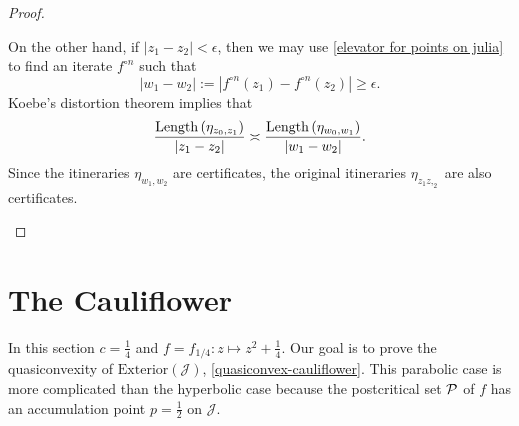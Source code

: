 \begin{proof}
\begin{enumerate}[label=\normalfont(\roman*)]
On the other hand, if $\left|z_{1}-z_{2}\right|<\epsilon$, then
we may use  \cref{elevator for points on julia} to find an iterate $f^{\circ n}$ such that 
\begin{equation}
	|w_1-w_2|:=\left|f^{\circ n}(z_{1})-f^{\circ n}(z_{2})\right|\geq\epsilon.
\end{equation}
Koebe's distortion theorem implies that 
\begin{equation}
	\frac{\operatorname{Length}\left(\eta_{z_{0},z_{1}}\right)}{|z_1-z_2|}\asymp\frac{\operatorname{Length}\left(\eta_{w_0,w_1}\right)}{|w_1-w_2|}.
\end{equation}
Since the itineraries $\eta_{w_1,w_2}$ are certificates, the original itineraries $\eta_{z_1z,_2}$ are also certificates. 
\begin{comment}
By a distortion estimate
\begin{equation*}
\Length\left(\eta_{z_{0},z_{1}}\right)\asymp\frac{\Length\left(\eta_{w_0,w_1}\right)}{\left|\left(f^{\circ n}\right)'\left(\zeta\right)\right|}
\end{equation*}
 for some point $\zeta \in \mathcal{J}$. The denominator grows
with $n$ exponentially at rate $\theta$, while the numerator has
a bound of the form 
\[
\Length\left(\eta_{w_1,w_2}\right)\lesssim\left|w_1-w_2\right|\lesssim\theta^{n}\left|z_{1}-z_{2}\right|.
\]
Altogether 
\[
\Length\left(\eta_{z_{1},z_{2}}\right)\lesssim\frac{\theta^{n}\left|z_{1}-z_{2}\right|}{\theta^{n}}=\left|z_{1}-z_{2}\right|
\]
 so $\eta_{z_{1},z_{2}}$ is a quasiconvexity certificate.
\end{comment}

\end{enumerate}
\end{proof}

\section{The Cauliflower}
In this section $c=\frac 14$ and $f=f_{1/4}: z\mapsto z^2+ \frac 14$.
Our goal is to prove the quasiconvexity of $\mathrm{Exterior}(\mathcal{J})$, \cref{quasiconvex-cauliflower}. This parabolic case is more complicated than the hyperbolic case because the postcritical set $\operatorname{\mathcal P}$ of $f$ has an accumulation point $p=\frac 12$ on $\mathcal J$.

